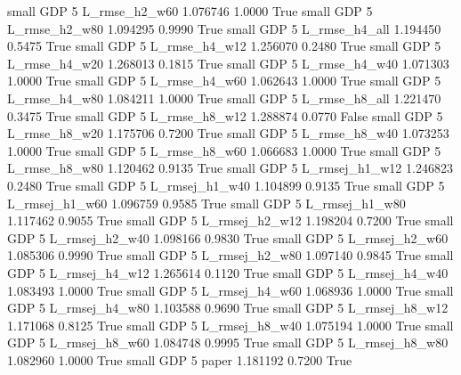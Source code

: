      small      GDP                 5  L_rmse_h2_w60   1.076746      1.0000    True
     small      GDP                 5  L_rmse_h2_w80   1.094295      0.9990    True
     small      GDP                 5  L_rmse_h4_all   1.194450      0.5475    True
     small      GDP                 5  L_rmse_h4_w12   1.256070      0.2480    True
     small      GDP                 5  L_rmse_h4_w20   1.268013      0.1815    True
     small      GDP                 5  L_rmse_h4_w40   1.071303      1.0000    True
     small      GDP                 5  L_rmse_h4_w60   1.062643      1.0000    True
     small      GDP                 5  L_rmse_h4_w80   1.084211      1.0000    True
     small      GDP                 5  L_rmse_h8_all   1.221470      0.3475    True
     small      GDP                 5  L_rmse_h8_w12   1.288874      0.0770   False
     small      GDP                 5  L_rmse_h8_w20   1.175706      0.7200    True
     small      GDP                 5  L_rmse_h8_w40   1.073253      1.0000    True
     small      GDP                 5  L_rmse_h8_w60   1.066683      1.0000    True
     small      GDP                 5  L_rmse_h8_w80   1.120462      0.9135    True
     small      GDP                 5 L_rmsej_h1_w12   1.246823      0.2480    True
     small      GDP                 5 L_rmsej_h1_w40   1.104899      0.9135    True
     small      GDP                 5 L_rmsej_h1_w60   1.096759      0.9585    True
     small      GDP                 5 L_rmsej_h1_w80   1.117462      0.9055    True
     small      GDP                 5 L_rmsej_h2_w12   1.198204      0.7200    True
     small      GDP                 5 L_rmsej_h2_w40   1.098166      0.9830    True
     small      GDP                 5 L_rmsej_h2_w60   1.085306      0.9990    True
     small      GDP                 5 L_rmsej_h2_w80   1.097140      0.9845    True
     small      GDP                 5 L_rmsej_h4_w12   1.265614      0.1120    True
     small      GDP                 5 L_rmsej_h4_w40   1.083493      1.0000    True
     small      GDP                 5 L_rmsej_h4_w60   1.068936      1.0000    True
     small      GDP                 5 L_rmsej_h4_w80   1.103588      0.9690    True
     small      GDP                 5 L_rmsej_h8_w12   1.171068      0.8125    True
     small      GDP                 5 L_rmsej_h8_w40   1.075194      1.0000    True
     small      GDP                 5 L_rmsej_h8_w60   1.084748      0.9995    True
     small      GDP                 5 L_rmsej_h8_w80   1.082960      1.0000    True
     small      GDP                 5          paper   1.181192      0.7200    True
